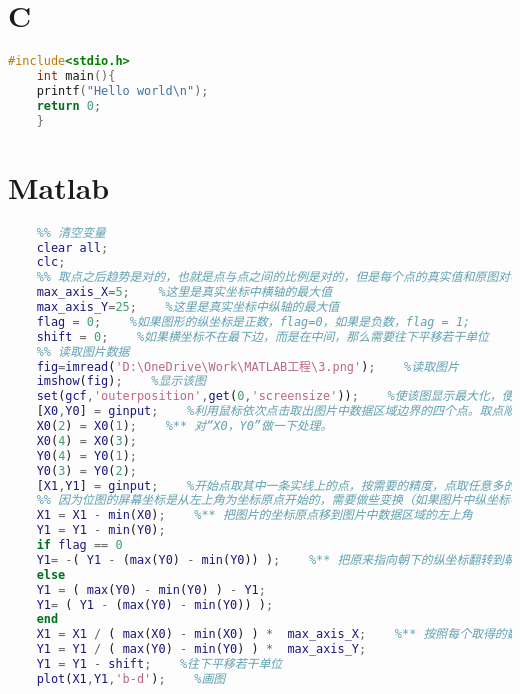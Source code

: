 \newpage
\begin{appendices}
	\section{C}
	\begin{lstlisting}[language=c]
	#include<stdio.h>
	int main(){
	printf("Hello world\n");
	return 0;
	}
	\end{lstlisting}
	\section{Matlab}
	\begin{lstlisting}[language = matlab]
	%% 只适用于横纵坐标是从0开始，如果不是，需要根据原理更改代码
	%% 清空变量
	clear all;
	clc;
	%% 取点之后趋势是对的，也就是点与点之间的比例是对的，但是每个点的真实值和原图对不%	上，需要按照真实的坐标处理一下
	max_axis_X=5;    %这里是真实坐标中横轴的最大值
	max_axis_Y=25;    %这里是真实坐标中纵轴的最大值
	flag = 0;    %如果图形的纵坐标是正数，flag=0，如果是负数，flag = 1;
	shift = 0;    %如果横坐标不在最下边，而是在中间，那么需要往下平移若干单位
	%% 读取图片数据
	fig=imread('D:\OneDrive\Work\MATLAB工程\3.png');    %读取图片
	imshow(fig);    %显示该图
	set(gcf,'outerposition',get(0,'screensize'));    %使该图显示最大化，便于取点
	[X0,Y0] = ginput;    %利用鼠标依次点击取出图片中数据区域边界的四个点。取点顺序：顺序%	点取图中坐标轴左下，左上，右上，右下四个点，回车结束。
	X0(2) = X0(1);    %** 对“X0，Y0”做一下处理。
	X0(4) = X0(3);
	Y0(4) = Y0(1);
	Y0(3) = Y0(2);
	[X1,Y1] = ginput;    %开始点取其中一条实线上的点，按需要的精度，点取任意多的点，回车%	结束。
	%% 因为位图的屏幕坐标是从左上角为坐标原点开始的，需要做些变换（如果图片中纵坐标不%	是从0开始，需要根据原理添加代码）
	X1 = X1 - min(X0);    %** 把图片的坐标原点移到图片中数据区域的左上角
	Y1 = Y1 - min(Y0);
	if flag == 0
	Y1= -( Y1 - (max(Y0) - min(Y0)) );    %** 把原来指向朝下的纵坐标翻转到朝上
	else
	Y1 = ( max(Y0) - min(Y0) ) - Y1;
	Y1= ( Y1 - (max(Y0) - min(Y0)) );
	end
	X1 = X1 / ( max(X0) - min(X0) ) *  max_axis_X;    %** 按照每个取得的数据点在原图片中位%	置比例换算成真实坐标
	Y1 = Y1 / ( max(Y0) - min(Y0) ) *  max_axis_Y;
	Y1 = Y1 - shift;    %往下平移若干单位
	plot(X1,Y1,'b-d');    %画图
	\end{lstlisting}
\end{appendices}


 
